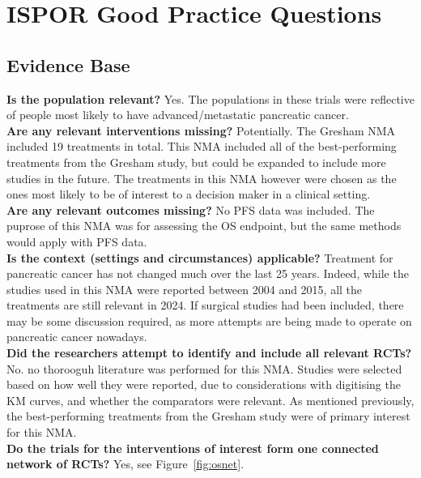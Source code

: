 \chapter{ISPOR Good Practice Questions}\label{isporqs}

\section{Evidence Base}
\textbf{Is the population relevant?} Yes. The populations in these trials were reflective of people most likely to have advanced/metastatic pancreatic cancer. \\ 

\textbf{Are any relevant interventions missing?} Potentially. The Gresham NMA included 19 treatments in total. This NMA included all of the best-performing treatments from the Gresham study, but could be expanded to include more studies in the future. The treatments in this NMA however were chosen as the ones most likely to be of interest to a decision maker in a clinical setting. \\ 

\textbf{Are any relevant outcomes missing?} No PFS data was included. The puprose of this NMA was for assessing the OS endpoint, but the same methods would apply with PFS data. \\

\textbf{Is the context (settings and circumstances) applicable?} Treatment for pancreatic cancer has not changed much over the last 25 years. Indeed, while the studies used in this NMA were reported between 2004 and 2015, all the treatments are still relevant in 2024. If surgical studies had been included, there may be some discussion required, as more attempts are being made to operate on pancreatic cancer nowadays. \\

\textbf{Did the researchers attempt to identify and include all
relevant RCTs?} No. no thorooguh literature was performed for this NMA. Studies were selected based on how well they were reported, due to considerations with digitising the KM curves, and whether the comparators were relevant. As mentioned previously, the best-performing treatments from the Gresham study were of primary interest for this NMA.\\

\textbf{Do the trials for the interventions of interest form one
connected network of RCTs?} Yes, see Figure~\ref{fig:osnet}.\\

